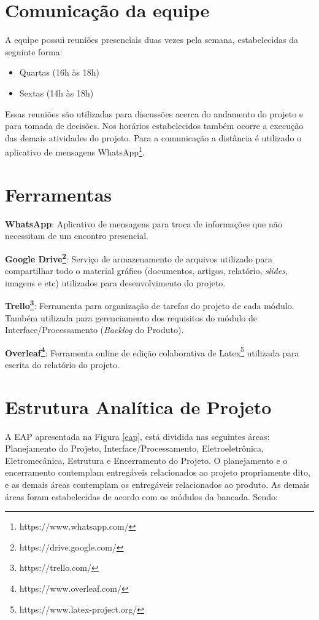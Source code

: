 \section*{Comunicação da equipe}
A equipe possui reuniões presenciais duas vezes pela semana, estabelecidas da seguinte forma:
\begin{center}
  \begin{itemize}
      \item Quartas (16h às 18h)
      \item Sextas (14h às 18h)
  \end{itemize}
\end{center}

Essas reuniões são utilizadas para discussões acerca do andamento do projeto e para tomada de decisões. Nos horários estabelecidos também ocorre a execução das demais atividades do projeto.
Para a comunicação a distância é utilizado o aplicativo de mensagens WhatsApp\footnote{https://www.whatsapp.com/}.

\section*{Ferramentas}

\textbf{WhatsApp}:
Aplicativo de mensagens para troca de informações que não necessitam de um encontro presencial.

\textbf{Google Drive\footnote{https://drive.google.com/}}: Serviço de armazenamento de arquivos utilizado para compartilhar todo o material gráfico (documentos, artigos, relatório, \textit{slides}, imagens e etc) utilizados para desenvolvimento do projeto.

\textbf{Trello\footnote{https://trello.com/}}:
Ferramenta para organização de tarefas do projeto de cada módulo. Também utilizada para gerenciamento dos requisitos do módulo de Interface/Processamento (\textit{Backlog} do Produto).

\textbf{Overleaf\footnote{https://www.overleaf.com/}}:
Ferramenta online de edição colaborativa de Latex\footnote{https://www.latex-project.org/} utilizada para escrita do relatório do projeto.

\section*{Estrutura Analítica de Projeto}

A EAP apresentada na Figura \ref{eap}, está dividida nas seguintes áreas: Planejamento do Projeto, Interface/Processamento, Eletroeletrônica, Eletromecânica, Estrutura e Encerramento do Projeto. O planejamento e o encerramento contemplam entregáveis relacionados ao projeto propriamente dito, e as demais áreas contemplam os entregáveis relacionados ao produto. As demais áreas foram estabelecidas de acordo com os módulos da bancada. Sendo:

